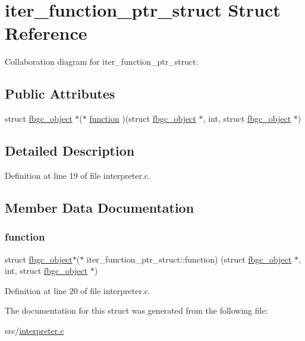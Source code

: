 \hypertarget{structiter__function__ptr__struct}{}\section{iter\+\_\+function\+\_\+ptr\+\_\+struct Struct Reference}
\label{structiter__function__ptr__struct}


Collaboration diagram for iter\+\_\+function\+\_\+ptr\+\_\+struct\+:
\subsection*{Public Attributes}
\begin{DoxyCompactItemize}
\item 
struct \hyperlink{structfbgc__object}{fbgc\+\_\+object} $\ast$($\ast$ \hyperlink{structiter__function__ptr__struct_abaaae6a59d2f3757b14f0ba773c7fb1f}{function} )(struct \hyperlink{structfbgc__object}{fbgc\+\_\+object} $\ast$, int, struct \hyperlink{structfbgc__object}{fbgc\+\_\+object} $\ast$)
\end{DoxyCompactItemize}


\subsection{Detailed Description}


Definition at line 19 of file interpreter.\+c.



\subsection{Member Data Documentation}
\mbox{\label{structiter__function__ptr__struct_abaaae6a59d2f3757b14f0ba773c7fb1f}} 
\subsubsection{\texorpdfstring{function}{function}}
{\footnotesize\ttfamily struct \hyperlink{structfbgc__object}{fbgc\+\_\+object}$\ast$($\ast$  iter\+\_\+function\+\_\+ptr\+\_\+struct\+::function) (struct \hyperlink{structfbgc__object}{fbgc\+\_\+object} $\ast$, int, struct \hyperlink{structfbgc__object}{fbgc\+\_\+object} $\ast$)}



Definition at line 20 of file interpreter.\+c.



The documentation for this struct was generated from the following file\+:\begin{DoxyCompactItemize}
\item 
src/\hyperlink{interpreter_8c}{interpreter.\+c}\end{DoxyCompactItemize}
